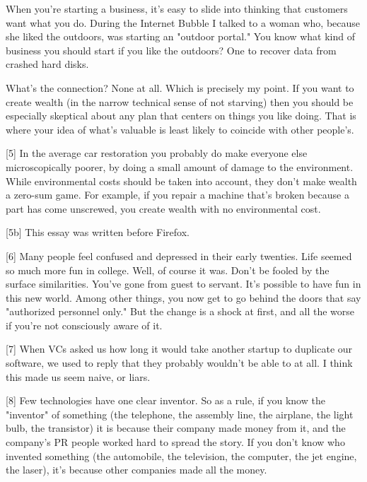 When you're
                    starting a business, it's easy to slide into thinking that
                    customers want what you do. During the Internet Bubble I
                    talked to a woman who, because she liked the outdoors, was
                    starting an "outdoor portal." You know what kind of business
                    you should start if you like the outdoors? One to recover
                    data from crashed hard disks.

What's the
                    connection? None at all. Which is precisely my point. If you
                    want to create wealth (in the narrow technical sense of not
                    starving) then you should be especially skeptical about any
                    plan that centers on things you like doing. That is where
                    your idea of what's valuable is least likely to coincide
                    with other people's.

[5] In the average car restoration you probably do make
                    everyone else microscopically poorer, by doing a small
                    amount of damage to the environment. While environmental
                    costs should be taken into account, they don't make wealth a
                    zero-sum game. For example, if you repair a machine that's
                    broken because a part has come unscrewed, you create wealth
                    with no environmental cost.

[5b] This essay was written before Firefox.

[6] Many people feel confused and depressed in their early
                    twenties. Life seemed so much more fun in college. Well, of
                    course it was. Don't be fooled by the surface similarities.
                    You've gone from guest to servant. It's possible to have fun
                    in this new world. Among other things, you now get to go
                    behind the doors that say "authorized personnel only." But
                    the change is a shock at first, and all the worse if you're
                    not consciously aware of it.

[7] When VCs asked us how long it would take another startup
                    to duplicate our software, we used to reply that they
                    probably wouldn't be able to at all. I think this made us
                    seem naive, or liars.

[8] Few technologies have one clear inventor. So as a rule,
                    if you know the "inventor" of something (the telephone, the
                    assembly line, the airplane, the light bulb, the transistor)
                    it is because their company made money from it, and the
                    company's PR people worked hard to spread the story. If you
                    don't know who invented something (the automobile, the
                    television, the computer, the jet engine, the laser), it's
                    because other companies made all the money.

